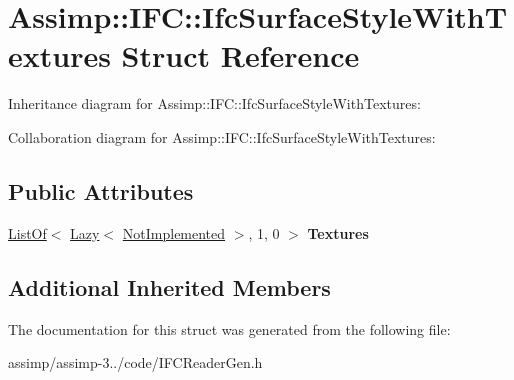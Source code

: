 \hypertarget{struct_assimp_1_1_i_f_c_1_1_ifc_surface_style_with_textures}{\section{Assimp\+:\+:I\+F\+C\+:\+:Ifc\+Surface\+Style\+With\+Textures Struct Reference}
\label{struct_assimp_1_1_i_f_c_1_1_ifc_surface_style_with_textures}
}


Inheritance diagram for Assimp\+:\+:I\+F\+C\+:\+:Ifc\+Surface\+Style\+With\+Textures\+:


Collaboration diagram for Assimp\+:\+:I\+F\+C\+:\+:Ifc\+Surface\+Style\+With\+Textures\+:
\subsection*{Public Attributes}
\begin{DoxyCompactItemize}
\item 
\hypertarget{struct_assimp_1_1_i_f_c_1_1_ifc_surface_style_with_textures_a6709e98c409c0d8b53171b5523e1421b}{\hyperlink{struct_assimp_1_1_s_t_e_p_1_1_list_of}{List\+Of}$<$ \hyperlink{struct_assimp_1_1_s_t_e_p_1_1_lazy}{Lazy}$<$ \hyperlink{struct_assimp_1_1_i_f_c_1_1_not_implemented}{Not\+Implemented} $>$, 1, 0 $>$ {\bfseries Textures}}\label{struct_assimp_1_1_i_f_c_1_1_ifc_surface_style_with_textures_a6709e98c409c0d8b53171b5523e1421b}

\end{DoxyCompactItemize}
\subsection*{Additional Inherited Members}


The documentation for this struct was generated from the following file\+:\begin{DoxyCompactItemize}
\item 
assimp/assimp-\/3../code/I\+F\+C\+Reader\+Gen.\+h\end{DoxyCompactItemize}
